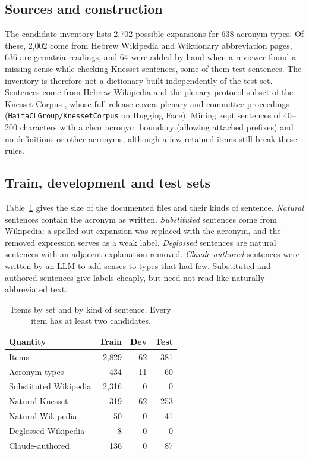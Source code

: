 \subsection{Sources and construction}
The candidate inventory lists 2,702 possible expansions for 638 acronym types. Of these, 2,002 come from Hebrew Wikipedia and Wiktionary abbreviation pages, 636 are gematria readings, and 64 were added by hand when a reviewer found a missing sense while checking Knesset sentences, some of them test sentences. The inventory is therefore not a dictionary built independently of the test set. Sentences come from Hebrew Wikipedia and the plenary-protocol subset of the Knesset Corpus \citep{goldin2025knesset}, whose full release covers plenary and committee proceedings (\texttt{HaifaCLGroup/KnessetCorpus} on Hugging Face). Mining kept sentences of 40--200 characters with a clear acronym boundary (allowing attached prefixes) and no definitions or other acronyms, although a few retained items still break these rules.

\subsection{Train, development and test sets}
Table~\ref{tab:data} gives the size of the documented files and their kinds of sentence. \emph{Natural} sentences contain the acronym as written. \emph{Substituted} sentences come from Wikipedia: a spelled-out expansion was replaced with the acronym, and the removed expression serves as a weak label. \emph{Deglossed} sentences are natural sentences with an adjacent explanation removed. \emph{Claude-authored} sentences were written by an LLM to add senses to types that had few. Substituted and authored sentences give labels cheaply, but need not read like naturally abbreviated text.

\begin{table}[t]
\centering\small
\begin{tabular}{@{}lrrr@{}}
\toprule
Quantity & Train & Dev & Test \\
\midrule
Items & 2,829 & 62 & 381 \\
Acronym types & 434 & 11 & 60 \\
\midrule
Substituted Wikipedia & 2,316 & 0 & 0 \\
Natural Knesset & 319 & 62 & 253 \\
Natural Wikipedia & 50 & 0 & 41 \\
Deglossed Wikipedia & 8 & 0 & 0 \\
Claude-authored & 136 & 0 & 87 \\
\bottomrule
\end{tabular}
\caption{Items by set and by kind of sentence. Every item has at least two candidates.}
\label{tab:data}
\end{table}


